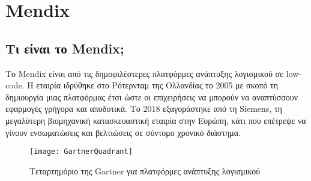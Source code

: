 \chapter{Mendix}

    \section{Τι είναι το Mendix;}
        Το Mendix είναι από τις δημοφιλέστερες πλατφόρμες ανάπτυξης λογισμικού σε low-code. Η εταιρία ιδρύθηκε στο Ρότερνταμ της Ολλανδίας το 2005 με σκοπό τη δημιουργία μιας πλατφόρμας έτσι ώστε οι επιχειρήσεις να μπορούν να αναπτύσσουν εφαρμογές γρήγορα και αποδοτικά. Το 2018 εξαγοράστηκε από τη Siemens, τη μεγαλύτερη βιομηχανική κατασκευαστική εταιρία στην Ευρώπη, κάτι που επέτρεψε να γίνουν ενσωματώσεις και βελτιώσεις σε σύντομο χρονικό διάστημα.

            \begin{figure}[h!] \noindent \centering
                    \texttt{[image: GartnerQuadrant]}
                    \caption{\centering Τεταρτημόριο της Gartner για πλατφόρμες ανάπτυξης λογισμικού \cite{mendixGartnerQuadrant}}
            \end{figure}

        \cite{LowCodeMendix}